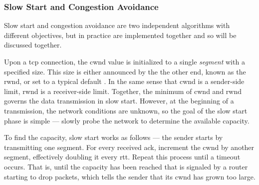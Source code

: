 \subsubsection{Slow Start and Congestion Avoidance}






Slow start and congestion avoidance are two independent algorithms with
different objectives, but in practice are implemented together and so will be discussed together.

Upon a \gls{tcp} connection, the \gls{cwnd} value is initialized to a single \textit{segment} with a specified size. This size is either  announced by the the other end, known as the \gls{rwnd}, or set to a typical default \cite{rfc5681}. In the same sense that \gls{cwnd} is a sender-side limit, \gls{rwnd} is a receiver-side limit. Together, the minimum of \gls{cwnd} and \gls{rwnd} governs the data transmission in slow start. However, at the beginning of a transmission, the network conditions are unknown, so the goal of the slow start phase is simple --- slowly probe the network to determine the available capacity.

To find the capacity, slow start works as follows --- the sender starts by transmitting one segment. For every received \gls{ack}, increment the \gls{cwnd} by another segment, effectively doubling it every \gls{rtt}. Repeat this process until a timeout occurs. That is, until the capacity has been reached that is signaled by a router starting to drop packets, which tells the sender that its \gls{cwnd} has grown too large.

